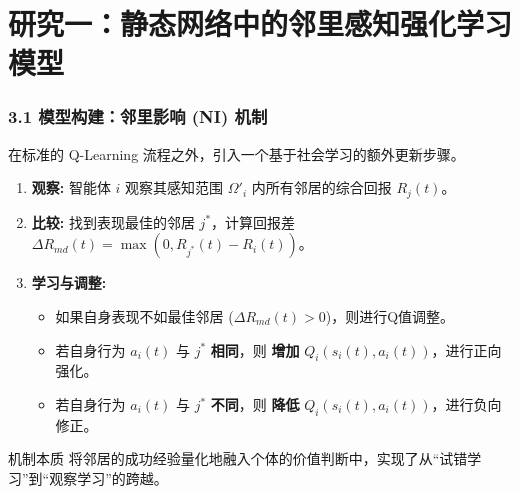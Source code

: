 \documentclass[UTF8]{beamer}
\begin{document}
\section{研究一：静态网络中的邻里感知强化学习模型}
\begin{frame}
    \frametitle{3.1 模型构建：邻里影响 (NI) 机制}
    在标准的 Q-Learning 流程之外，引入一个基于社会学习的额外更新步骤。
    
    \begin{enumerate}
        \item<1-> \textbf{观察:} 智能体 $i$ 观察其感知范围 $\Omega'_i$ 内所有邻居的综合回报 $R_j(t)$。
        \pause
        \item<2-> \textbf{比较:} 找到表现最佳的邻居 $j^*$，计算回报差 $\Delta R_{md}(t) = \max(0, R_{j^*}(t) - R_i(t))$。
        \pause
        \item<3-> \textbf{学习与调整:}
        \begin{itemize}
            \item 如果自身表现不如最佳邻居 ($\Delta R_{md}(t) > 0$)，则进行Q值调整。
            \item 若自身行为 $a_i(t)$ 与 $j^*$ \textbf{相同}，则 \textbf{增加} $Q_i(s_i(t), a_i(t))$，进行正向强化。
            \item 若自身行为 $a_i(t)$ 与 $j^*$ \textbf{不同}，则 \textbf{降低} $Q_i(s_i(t), a_i(t))$，进行负向修正。
        \end{itemize}
    \end{enumerate}
    
    \begin{alertblock}{机制本质}
        将邻居的成功经验量化地融入个体的价值判断中，实现了从“试错学习”到“观察学习”的跨越。
    \end{alertblock}
\end{frame}
\end{document}
